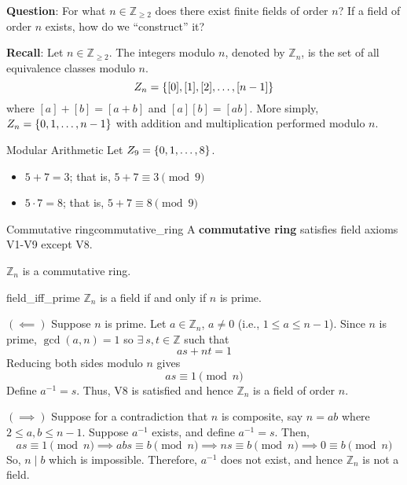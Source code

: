 \textbf{Question}: For what $ n\in\mathbb{Z}_{\geqslant 2} $ does there exist
finite fields of order $ n $? If a field of order $ n $ exists, how do
we ``construct'' it?

\textbf{Recall}: Let $ n\in\mathbb{Z}_{\geqslant 2} $.
The integers modulo $ n $, denoted by
$ \mathbb{Z}_n $, is the set of all equivalence classes modulo $ n $.
\[ \relax{Z}_n=\{[0],[1],[2],\ldots ,[n-1]\} \]
where $ [a]+[b]=[a+b] $ and $ [a][b]=[ab] $.
More simply, $ \relax{Z}_{n}=\{0,1,\ldots ,n-1\} $
with addition and multiplication performed modulo $ n $.

\begin{Example}{Modular Arithmetic}{}
    Let $ \relax{Z}_9=\{0,1,\ldots ,8\} $.
    \begin{itemize}
        \item $ 5+7=3 $; that is, $ 5+7\equiv 3 \pmod{9} $
        \item $ 5\cdot 7=8 $; that is, $ 5+7\equiv 8 \pmod{9} $
    \end{itemize}
\end{Example}

\begin{Definition}{Commutative ring}{commutative_ring}
    A \textbf{commutative ring} satisfies field axioms V1-V9 except
    V8.
\end{Definition}

\begin{Theorem}{}{}
    $ \mathbb{Z}_n $ is a commutative ring.
\end{Theorem}

\begin{Theorem}{}{field_iff_prime}
    $ \mathbb{Z}_n $ is a field if and only if $ n $ is prime.
\end{Theorem}

\begin{Proof}{}{}
    $ (\impliedby) $ Suppose $ n $ is prime. Let $ a\in\mathbb{Z}_n $, $ a\neq 0 $
    (i.e., $ 1\leqslant a\leqslant n-1 $). Since $ n $ is prime, $ \gcd(a,n)=1 $
    so $ \exists\ s,t\in\mathbb{Z} $ such that
    \[ as+nt=1 \]
    Reducing both sides modulo $ n $ gives
    \[ as\equiv 1 \pmod{n} \]
    Define $ a^{-1}=s $. Thus, V8 is satisfied and hence $ \mathbb{Z}_n $
    is a field of order $ n $.

    $ (\implies) $ Suppose for a contradiction that $ n $ is composite, say $ n=ab $
    where $ 2\leqslant a,b\leqslant n-1 $. Suppose $ a^{-1} $ exists, and define
    $ a^{-1}=s $. Then,
    \[ as\equiv 1 \pmod{n}\implies abs\equiv b\pmod{n}\implies ns\equiv b \pmod{n}
        \implies 0\equiv b\pmod{n} \]
    So, $ n\mid b $ which is impossible. Therefore, $ a^{-1} $ does not exist, and hence
    $ \mathbb{Z}_n $ is not a field.
\end{Proof}

